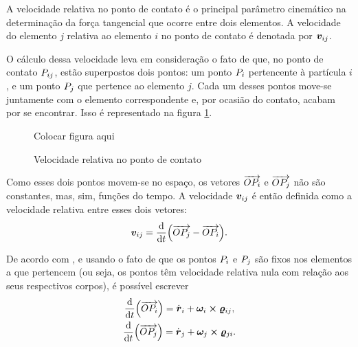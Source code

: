 A velocidade relativa no ponto de contato é o principal parâmetro cinemático na determinação da força tangencial que ocorre entre dois elementos. A velocidade do elemento \(j\) relativa ao elemento \(i\) no ponto de contato é denotada por \({\bm{v}}_{i j}\).

O cálculo dessa velocidade leva em consideração o fato de que, no ponto de contato \({P}_{i j}\), estão superpostos dois pontos: um ponto \({P}_{i}\) pertencente à partícula \(i\), e um ponto \({P}_{j}\) que pertence ao elemento \(j\). Cada um desses pontos move-se juntamente com o elemento correspondente e, por ocasião do contato, acabam por se encontrar. Isso é representado na figura \ref{fig:relative_velocity}.

\begin{figure}[h]
	\caption{Velocidade relativa no ponto de contato}
	\begin{center}
		\alert{Colocar figura aqui}
	\end{center}
	\label{fig:relative_velocity}
\end{figure}

Como esses dois pontos movem-se no espaço, os vetores \(\overrightarrow{O {P}_{i}}\) e \(\overrightarrow{O {P}_{j}}\) não são constantes, mas, sim, funções do tempo. A velocidade \({\bm{v}}_{i j}\) é então definida como a velocidade relativa entre esses dois vetores:
\begin{equation*}
	{\bm{v}}_{i j} = \dv{t}(\overrightarrow{O {P}_{j}} - \overrightarrow{O {P}_{i}}).
\end{equation*}

De acordo com , e usando o fato de que os pontos \({P}_{i}\) e \({P}_{j}\) são fixos nos elementos a que pertencem (ou seja, os pontos têm velocidade relativa nula com relação aos seus respectivos corpos), é possível escrever
\begin{gather*}
	\dv{t}(\vectorFromPoints{\originPoint}{\contactPointi}) = \velocityi + \angularVelocityi\cross\contactVectorij, \\
	\dv{t}(\vectorFromPoints{\originPoint}{\contactPointj}) = \velocityj + \angularVelocityj\cross\contactVectorji.
\end{gather*}

